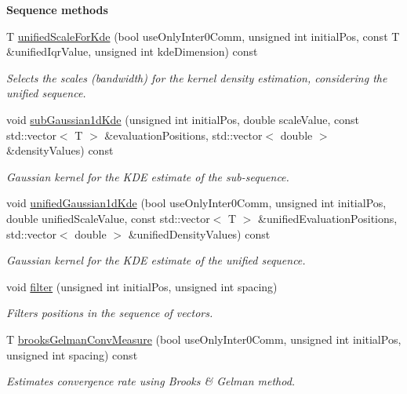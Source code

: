 \begin{Indent}{\bf Sequence methods}
\begin{DoxyCompactItemize}
T \hyperlink{class_q_u_e_s_o_1_1_scalar_sequence_a9d0d278d0f3e7c5d3ad84d415b1fd212}{unified\-Scale\-For\-Kde} (bool use\-Only\-Inter0\-Comm, unsigned int initial\-Pos, const T \&unified\-Iqr\-Value, unsigned int kde\-Dimension) const 
\begin{DoxyCompactList}\small\item\em Selects the scales (bandwidth) for the kernel density estimation, considering the unified sequence. \end{DoxyCompactList}\item 
void \hyperlink{class_q_u_e_s_o_1_1_scalar_sequence_af16ce4767da1bfe61f40652d3fb6d418}{sub\-Gaussian1d\-Kde} (unsigned int initial\-Pos, double scale\-Value, const std\-::vector$<$ T $>$ \&evaluation\-Positions, std\-::vector$<$ double $>$ \&density\-Values) const 
\begin{DoxyCompactList}\small\item\em Gaussian kernel for the K\-D\-E estimate of the sub-\/sequence. \end{DoxyCompactList}\item 
void \hyperlink{class_q_u_e_s_o_1_1_scalar_sequence_a7009705f4e50e898ef698e041f100bf2}{unified\-Gaussian1d\-Kde} (bool use\-Only\-Inter0\-Comm, unsigned int initial\-Pos, double unified\-Scale\-Value, const std\-::vector$<$ T $>$ \&unified\-Evaluation\-Positions, std\-::vector$<$ double $>$ \&unified\-Density\-Values) const 
\begin{DoxyCompactList}\small\item\em Gaussian kernel for the K\-D\-E estimate of the unified sequence. \end{DoxyCompactList}\item 
void \hyperlink{class_q_u_e_s_o_1_1_scalar_sequence_aaf386a04a0cebd7f88c5b7694a5fd3d1}{filter} (unsigned int initial\-Pos, unsigned int spacing)
\begin{DoxyCompactList}\small\item\em Filters positions in the sequence of vectors. \end{DoxyCompactList}\item 
T \hyperlink{class_q_u_e_s_o_1_1_scalar_sequence_adc59a20ebed60e16e930dc9859c365ce}{brooks\-Gelman\-Conv\-Measure} (bool use\-Only\-Inter0\-Comm, unsigned int initial\-Pos, unsigned int spacing) const 
\begin{DoxyCompactList}\small\item\em Estimates convergence rate using Brooks \& Gelman method. \end{DoxyCompactList}\item 

\end{DoxyCompactItemize}
\end{Indent}
